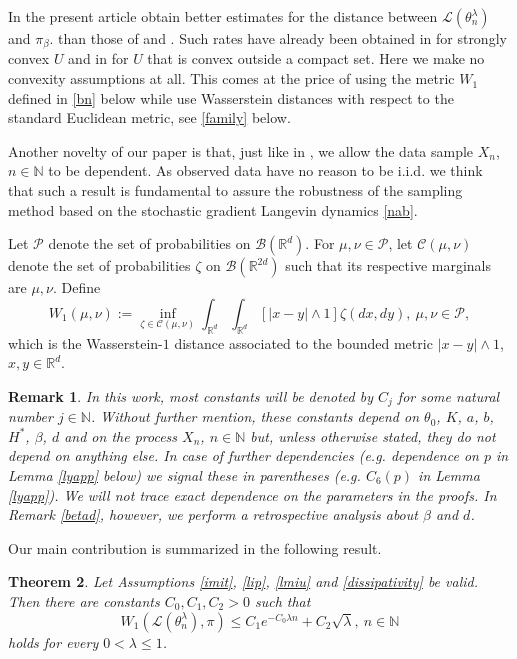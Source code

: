\documentclass[a4paper,draft]{article}
\newtheorem{theorem}{Theorem}[section]
\newtheorem{remark}[theorem]{Remark}
\begin{document}
In the present article obtain better estimates for
the distance between $\mathcal{L}(\theta^{\lambda}_n)$ and $\pi_{\beta}$.
than those of \cite{raginsky} and
\cite{xu}. Such rates have already been obtained in \cite{convex}
for strongly convex $U$ and in \cite{alex} for $U$ that is convex outside
a compact set. Here we make no convexity assumptions at all.
This comes at the price of using the metric $W_1$ defined in \eqref{bn} below while
\cite{raginsky,xu,alex,convex} use Wasserstein distances with respect to the
standard Euclidean metric, see \eqref{family} below.

Another novelty of our paper is that, just like in \cite{convex},
we allow the data sample $X_n$, $n\in\mathbb{N}$ to be dependent. As observed data have no reason
to be i.i.d. we think that such a result is
fundamental to assure the robustness of the sampling method based on the stochastic
gradient Langevin dynamics \eqref{nab}.

Let $\mathcal{P}$ denote the set of probabilities on $\mathcal{B}(\mathbb{R}^d)$.
For $\mu,\nu\in\mathcal{P}$,
let $\mathcal{C}(\mu,\nu)$ denote the set of probabilities $\zeta$
on $\mathcal{B}(\mathbb{R}^{2d})$ such that its respective marginals are $\mu,\nu$. Define
\begin{equation}\label{bn}
W_1(\mu,\nu):=\inf_{\zeta\in\mathcal{C}(\mu,\nu)}\int_{\mathbb{R}^d}\int_{\mathbb{R}^d} [|x-y|\wedge 1]\zeta(dx,dy),\ \mu,\nu\in\mathcal{P},
\end{equation}
which is the Wasserstein-$1$ distance associated to the bounded metric $|x-y|\wedge 1$,
$x,y\in\mathbb{R}^d$.

\begin{remark} {\rm In this work, most constants will be denoted by $C_j$ for some natural number
$j\in\mathbb{N}$.
Without further mention, these constants depend on $\theta_0$, $K$, $a$, $b$,
$H^*$, $\beta$, $d$ and on the process $X_n$, $n\in\mathbb{N}$ but, unless otherwise stated,
they do not depend on anything else. In case of further dependencies (e.g. dependence on $p$
in Lemma \ref{lyapp} below) we signal these in parentheses (e.g. $C_6(p)$ in Lemma
\ref{lyapp}). We will not trace exact dependence on the parameters in the proofs. In Remark \ref{betad},
however, we perform a retrospective analysis about $\beta$ and $d$.}
\end{remark}

Our main contribution is summarized in the
following result.

\begin{theorem}\label{main} Let Assumptions \ref{imit}, \ref{lip}, \ref{lmiu} and \ref{dissipativity}
be valid. Then there are constants
$C_0,C_1,C_2>0$ such that
\begin{equation}\label{manyi}
W_1(\mathcal{L}(\theta^{\lambda}_n),\pi)\leq C_1 e^{-C_0\lambda n}+C_2\sqrt{\lambda}
,\ n\in\mathbb{N}
\end{equation}
holds for every $0<\lambda\leq 1$.
\end{theorem}
\end{document}
